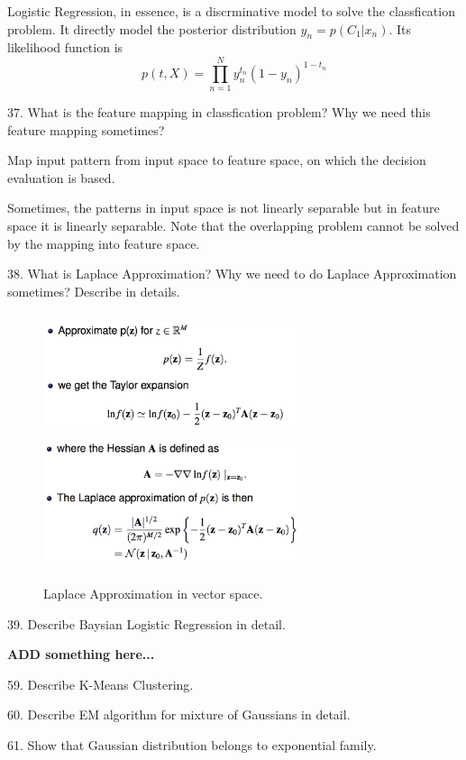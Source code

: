 \documentclass[11pt,a4paper]{article}
\newcommand{\BOLD}[1]{\textbf{#1}}
\begin{document}
    Logistic Regression, in essence, is a discrminative model to solve the classfication problem. It directly model the posterior distribution $y_n = p(C_1 | x_n)$. Its likelihood function is 
    $$ p(t,X) = \prod_{n=1}^{N} y_{n}^{t_n} (1 - y_n) ^{1 - t_n} $$


37. What is the feature mapping in classfication problem? Why we need this feature mapping sometimes?

    Map input pattern from input space to feature space, on which the decision evaluation is based. 

    Sometimes, the patterns in input space is not linearly separable but in feature space it is linearly separable. Note that the overlapping problem cannot be solved by the mapping into feature space.

38. What is Laplace Approximation? Why we need to do Laplace Approximation sometimes? Describe in details. 
{
    \begin{figure}[H] \centering
    \includegraphics[width=3in,height=1.4in]{./figure/Laplace_1.png}
    \includegraphics[width=3in,height=1.5in]{./figure/Laplace_2.png}
    \caption{Laplace Approximation in vector space.}
\end{figure}
}

39. Describe Baysian Logistic Regression in detail.

    \BOLD{ADD something here...}

    \newpage

59. Describe K-Means Clustering.

60. Describe EM algorithm for mixture of Gaussians in detail.

61. Show that Gaussian distribution belongs to exponential family.
\end{document}
